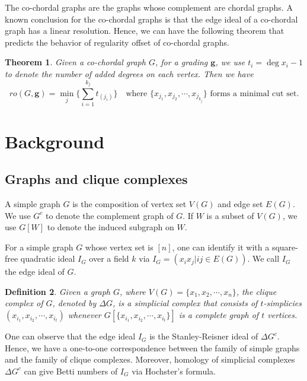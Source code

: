 \documentclass[dvipsnames,10pt]{article}
\newtheorem{theorem}{Theorem}[section]
\newtheorem{defi}[theorem]{Definition}
\begin{document}
The co-chordal graphs are the graphs whose complement are chordal graphs. A known conclusion for the co-chordal graphs is that the edge ideal of a co-chordal graph has a linear resolution. Hence, we can have the following theorem that predicts the behavior of regularity offset of co-chordal graphs.

\begin{theorem}
   Given a co-chordal graph $G$, for a grading $\mathbf{g}$, we use $t_i=\deg x_i-1$ to denote the number of added degrees on each vertex. Then we have
\begin{equation*}
    ro(G,\mathbf{g})=\min_{j}\{\sum_{i=1}^{k_j}t_{(j_i)}\}\quad \text{where $\{x_{j_1},x_{j_2},\cdots,x_{j_{k_j}}\}$ forms a minimal cut set.}
\end{equation*} 
\end{theorem}



\section{Background}
\subsection{Graphs and clique complexes}
A simple graph $G$ is the composition of vertex set $V(G)$ and edge set $E(G)$. We use $G^c$ to denote the complement graph of $G$. If $W$ is a subset of $V(G)$, we use $G[W]$ to denote the induced subgraph on $W$.

For a simple graph $G$ whose vertex set is $[n]$, one can identify it with
a square-free quadratic ideal $I_G$ over a field $k$ via $I_G=(x_ix_j | ij\in E(G))$. We call $I_G$ the edge ideal of $G$.

\begin{defi}
    Given a graph $G$, where $V(G)=\{x_1,x_2,\cdots,x_n\}$, the clique complex of $G$, denoted by $\Delta G$, is a simplicial complex that consists of $t$-simplicies $(x_{i_1},x_{i_2},\cdots ,x_{i_t})$ whenever $G[\{x_{i_1},x_{i_2},\cdots ,x_{i_t}\}]$ is a complete graph of $t$ vertices.
\end{defi}

One can observe that the edge ideal $I_G$ is the Stanley-Reisner ideal of $\Delta G^c$. Hence, we have a one-to-one correspondence between the family of simple graphs and the family of clique complexes. Moreover, homology of simplicial complexes $\Delta G^c$ can give Betti numbers of $I_G$ via Hochster's formula.
\end{document}
